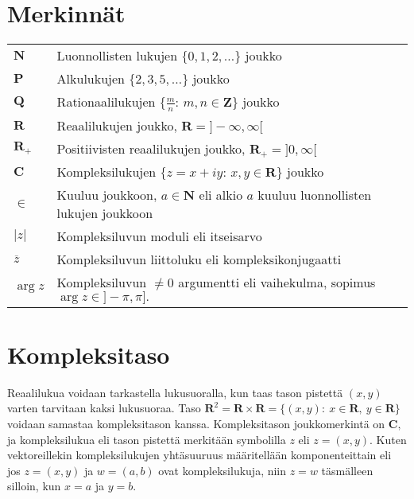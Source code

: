 \documentclass[a4paper, 12pt]{article}
\theoremstyle{remark}
\theoremstyle{definition}
\renewcommand{\bar}[1]{\overline{#1}}
\newcommand{\abs}[1]{\lvert#1\rvert}
\begin{document}
\section*{Merkinnät}
\begin{tabular}{ll}
$\mathbf{N}$ & Luonnollisten lukujen $\{0, 1, 2, \ldots\}$ joukko\\
$\mathbf{P}$ & Alkulukujen $\{2, 3, 5, \ldots\}$ joukko\\
$\mathbf{Q}$ & Rationaalilukujen $\{\frac{m}{n}:\, m, n\in\mathbf{Z}\}$ joukko\\
$\mathbf{R}$ & Reaalilukujen joukko, $\mathbf{R}=]-\infty, \infty[$\\
$\mathbf{R}_+$ & Positiivisten reaalilukujen joukko, $\mathbf{R}_+=]0, \infty[$\\
$\mathbf{C}$ & Kompleksilukujen $\{z=x+iy:\, x, y\in\mathbf{R}\}$ joukko\\
$\in$ & Kuuluu joukkoon, $a\in \mathbf{N}$ eli alkio $a$ kuuluu luonnollisten lukujen joukkoon\\
$\abs{z}$ & Kompleksiluvun moduli eli itseisarvo\\
$\bar{z}$ & Kompleksiluvun liittoluku eli kompleksikonjugaatti\\
$\arg{z}$ & Kompleksiluvun $\neq 0$ argumentti eli vaihekulma, sopimus $\arg{z}\in]-\pi, \pi].$
\end{tabular}
\clearpage
{}


\section{Kompleksitaso}
Reaalilukua voidaan tarkastella lukusuoralla, kun taas tason pistettä $(x,y)$ varten tarvitaan kaksi lukusuoraa. Taso $\mathbf{R}^2=\mathbf{R}\times\mathbf{R}=\{(x,y):\ x\in\mathbf{R}, \ y\in\mathbf{R}\}$ voidaan samastaa kompleksitason kanssa. Kompleksitason joukkomerkintä on $\mathbf{C},$ ja kompleksilukua eli tason pistettä merkitään symbolilla $z$ eli $z=(x,y).$ Kuten vektoreillekin kompleksilukujen yhtäsuuruus määritellään komponenteittain eli jos $z=(x, y)$ ja $w=(a, b)$ ovat kompleksilukuja, niin
$z=w$ täsmälleen silloin, kun $x=a$ ja $y=b.$
\end{document}
